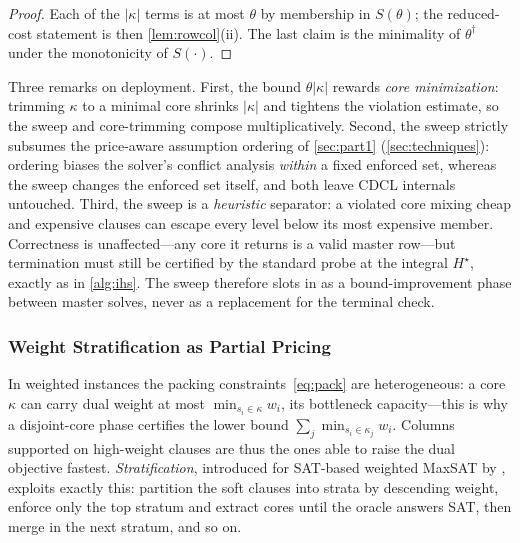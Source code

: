 
\begin{proof}
Each of the $|\kappa|$ terms is at most $\theta$ by membership in
$S(\theta)$; the reduced-cost statement is then \cref{lem:rowcol}(ii). The
last claim is the minimality of $\theta^\dagger$ under the monotonicity of
$S(\cdot)$.
\end{proof}

Three remarks on deployment. First, the bound $\theta|\kappa|$ rewards
\emph{core minimization}: trimming $\kappa$ to a minimal core shrinks
$|\kappa|$ and tightens the violation estimate, so the sweep and
core-trimming compose multiplicatively. Second, the sweep strictly
subsumes the price-aware assumption ordering of \cref{sec:part1}
(\cref{sec:techniques}): ordering biases the solver's conflict analysis
\emph{within} a fixed enforced set, whereas the sweep changes the enforced
set itself, and both leave CDCL internals untouched. Third, the sweep is a
\emph{heuristic} separator: a violated core mixing cheap and expensive
clauses can escape every level below its most expensive member.
Correctness is unaffected---any core it returns is a valid master
row---but termination must still be certified by the standard probe at the
integral $H^\star$, exactly as in \cref{alg:ihs}. The sweep therefore
slots in as a bound-improvement phase between master solves, never as a
replacement for the terminal check.

\subsubsection{Weight Stratification as Partial Pricing}
\label{sec:stratified}

In weighted instances the packing constraints~\eqref{eq:pack} are
heterogeneous: a core $\kappa$ can carry dual weight at most
$\min_{s_i \in \kappa} w_i$, its bottleneck capacity---this is why a
disjoint-core phase certifies the lower bound $\sum_j \min_{s_i \in
\kappa_j} w_i$. Columns supported on high-weight clauses are thus the ones
able to raise the dual objective fastest. \emph{Stratification}, introduced
for SAT-based weighted MaxSAT by \citet{ansotegui2012improving}, exploits
exactly this: partition the soft clauses into strata by descending weight,
enforce only the top stratum and extract cores until the oracle answers
SAT, then merge in the next stratum, and so on.

